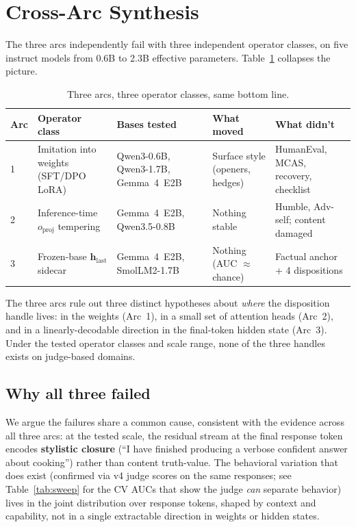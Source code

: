 \documentclass[11pt,a4paper]{article}
\begin{document}
\section{Cross-Arc Synthesis}

The three arcs independently fail with three independent operator classes, on five instruct models from 0.6B to 2.3B effective parameters. Table~\ref{tab:threearcs} collapses the picture.

\begin{table}[h]
\centering
\small
\caption{Three arcs, three operator classes, same bottom line.}
\label{tab:threearcs}
\begin{tabular}{p{0.5cm}p{3.0cm}p{3.2cm}p{2.8cm}p{3.0cm}}
\toprule
Arc & Operator class & Bases tested & What moved & What didn't \\
\midrule
1 & Imitation into weights (SFT/DPO LoRA) & Qwen3-0.6B, Qwen3-1.7B, Gemma~4~E2B & Surface style (openers, hedges) & HumanEval, MCAS, recovery, checklist \\
2 & Inference-time $o_{\text{proj}}$ tempering & Gemma~4~E2B, Qwen3.5-0.8B & Nothing stable & Humble, Adv-self; content damaged \\
3 & Frozen-base $\mathbf{h}_{\text{last}}$ sidecar & Gemma~4~E2B, SmolLM2-1.7B & Nothing (AUC $\approx$ chance) & Factual anchor + 4 dispositions \\
\bottomrule
\end{tabular}
\end{table}

The three arcs rule out three distinct hypotheses about \emph{where} the disposition handle lives: in the weights (Arc~1), in a small set of attention heads (Arc~2), and in a linearly-decodable direction in the final-token hidden state (Arc~3). Under the tested operator classes and scale range, none of the three handles exists on judge-based domains.

\subsection{Why all three failed}

We argue the failures share a common cause, consistent with the evidence across all three arcs: at the tested scale, the residual stream at the final response token encodes \textbf{stylistic closure} (``I have finished producing a verbose confident answer about cooking'') rather than content truth-value. The behavioral variation that does exist (confirmed via v4 judge scores on the same responses; see Table~\ref{tab:sweep} for the CV AUCs that show the judge \emph{can} separate behavior) lives in the joint distribution over response tokens, shaped by context and capability, not in a single extractable direction in weights or hidden states.
\end{document}
